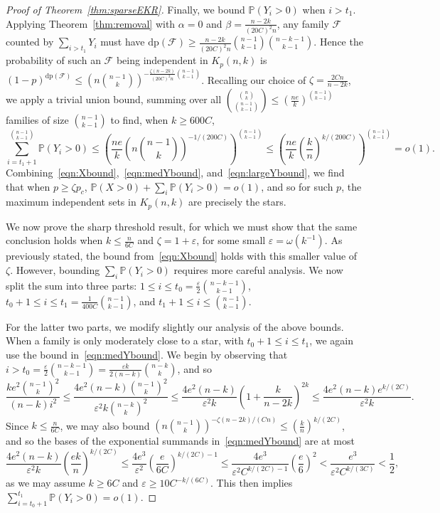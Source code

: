\documentclass[11pt]{article}
\theoremstyle{definition}
\newcommand{\eps}{\varepsilon}
\newcommand{\cF}{\mathcal{F}}
\newcommand{\3}{\bf{3}}
\newcommand{\disj}{\mathrm{dp}}
\newcommand{\Prb}{\mathbb{P}}
\begin{document}
\begin{proof}[Proof of Theorem~\ref{thm:sparseEKR}]
Finally, we bound $\Prb(Y_i > 0)$ when $i > t_1$.  Applying Theorem~\ref{thm:removal} with $\alpha = 0$ and $\beta = \frac{n-2k}{(20C)^2 n}$, any family $\cF$ counted by $\sum_{i > t_1} Y_i$ must have $\disj(\cF) \ge \frac{n-2k}{(20C)^2 n} \binom{n-1}{k-1} \binom{n-k-1}{k-1}$.  Hence the probability of such an $\cF$ being independent in $K_p(n,k)$ is $(1 - p)^{\disj(\cF)} \le \left(n \binom{n-1}{k} \right)^{- \frac{\zeta (n-2k)}{(20C)^2 n} \binom{n-1}{k-1}}$.  Recalling our choice of $\zeta = \frac{2Cn}{n-2k}$, we apply a trivial union bound, summing over all $\binom{\binom{n}{k}}{\binom{n-1}{k-1}} \le \left( \frac{ne}{k} \right)^{\binom{n-1}{k-1}}$  families of size $\binom{n-1}{k-1}$ to find, when $k \ge 600C$,
\begin{equation} \label{eqn:largeYbound}
\sum_{i = t_1+1}^{\binom{n-1}{k-1}} \Prb(Y_i > 0) \le \left( \frac{ne}{k} \left( n \binom{n-1}{k} \right)^{- 1/ (200C)} \right)^{\binom{n-1}{k-1}} \le \left( \frac{ne}{k} \left( \frac{k}{n} \right)^{k/(200C)} \right)^{\binom{n-1}{k-1}} = o(1).
\end{equation}
Combining~\eqref{eqn:Xbound},~\eqref{eqn:medYbound}, and~\eqref{eqn:largeYbound}, we find that when $p \ge \zeta p_c$, $\Prb(X > 0) + \sum_i \Prb(Y_i > 0) = o(1)$, and so for such $p$, the maximum independent sets in $K_p(n,k)$ are precisely the stars.

We now prove the sharp threshold result, for which we must show that the same conclusion holds when $k \le \frac{n}{6C}$ and $\zeta = 1 + \eps$, for some small $\eps = \omega(k^{-1})$.  As previously stated, the bound from~\eqref{eqn:Xbound} holds with this smaller value of $\zeta$.  However, bounding $\sum_i \Prb(Y_i > 0)$ requires more careful analysis.  We now split the sum into three parts: $1 \le i \le t_0 = \frac{\eps}{2} \binom{n-k-1}{k-1}$, $t_0 + 1 \le i \le t_1 = \frac{1}{400C} \binom{n-1}{k-1}$, and $t_1 + 1 \le i \le \binom{n-1}{k-1}$.

For the latter two parts, we modify slightly our analysis of the above bounds.  When a family is only moderately close to a star, with $t_0 + 1 \le i \le t_1$, we again use the bound in~\eqref{eqn:medYbound}.  We begin by observing that $i > t_0 = \frac{\eps}{2} \binom{n-k-1}{k-1} = \frac{\eps k}{2 (n-k)} \binom{n-k}{k}$, and so
\[ \frac{k e^2 \binom{n-1}{k}^2}{(n-k)i^2} \le \frac{4 e^2 (n-k) \binom{n-1}{k}^2}{\eps^2 k \binom{n-k}{k}^2} \le \frac{4e^2(n-k)}{\eps^2 k} \left( 1 + \frac{k}{n-2k} \right)^{2k} \le \frac{4e^2 (n-k) e^{k/(2C)}}{\eps^2 k} .\]
Since $k \le \frac{n}{6C}$, we may also bound $\left( n \binom{n-1}{k} \right)^{ - \zeta (n-2k)/(Cn)} \le \left( \frac{k}{n} \right)^{k/(2C)}$, and so the bases of the exponential summands in~\eqref{eqn:medYbound} are at most
\[ \frac{4e^2(n-k)}{\eps^2 k} \left( \frac{e k}{n} \right)^{k/(2C)} \le \frac{4e^3}{\eps^2} \left( \frac{e}{6C} \right)^{k/(2C) - 1} \le \frac{4e^3}{\eps^2 C^{k/(2C)-1}} \left( \frac{e}{6} \right)^2 < \frac{e^3}{\eps^2 C^{k/(3C)}} < \frac12, \]
as we may assume $k \ge 6C$ and $\eps \ge 10 C^{-k/(6C)}$.  This then implies $\sum_{i = t_0 + 1}^{t_1} \Prb(Y_i > 0) = o(1)$.


\end{proof}
\end{document}

